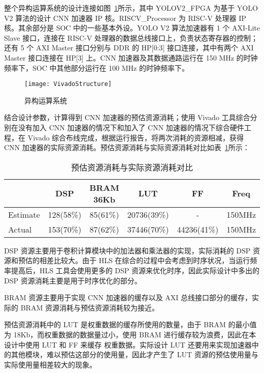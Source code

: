 整个异构运算系统的设计连接如图~\ref{fig:VivadoStructure}所示，其中 YOLOV2\_FPGA 为基于 YOLO V2 算法的设计 CNN 加速器 IP 核。RISCV\_Processor 为 RISC-V 处理器 IP 核。其余部分是 SOC 中的一些基本外设。YOLO V2 算法加速器有 1 个 AXI-Lite Slave 接口，连接在 RISC-V 处理器的数据总线接口上，负责状态寄存器的控制；还有 5 个 AXI Master 接口分别与 DDR 的 HP[0:3] 接口连接，其中有两个 AXI Master 接口连接在 HP[3] 上。CNN 加速器及其数据通路运行在 150 MHz 的时钟频率下，SOC 中其他部分运行在 100 MHz 的时钟频率下。

\begin{figure}[!htbp]
    \centering
    \texttt{[image: VivadoStructure]}
    \caption{异构运算系统}
    \label{fig:VivadoStructure}
\end{figure}

结合设计参数，计算得到 CNN 加速器的预估资源消耗；使用 Vivado 工具综合分别在没有加入 CNN 加速器的情况下和加入了 CNN 加速器的情况下综合硬件工程，在 Vivado 综合布线完成，根据运行报告，将两次消耗的资源相减，获得 CNN 加速器的实际资源消耗。预估资源消耗与实际资源消耗对比如表~\ref{tab:resource}所示：

\begin{table}[!htbp]
\caption{预估资源消耗与实际资源消耗对比}
\label{tab:resource}
\centering
\footnotesize%
\setlength{\tabcolsep}{4pt}%
\renewcommand{\arraystretch}{1.2}%
\begin{tabular}{lccccc}
\toprule
            & DSP       & BRAM 36Kb& LUT         & FF           & Freq \\
\midrule
Estimate    & 128(58\%) & 85(61\%) & 20736(39\%) & -            & 150MHz \\
Actual      & 153(70\%) & 87(62\%) & 37446(70\%) & 44236(41\%)  & 150MHz \\
\bottomrule
\end{tabular}
\end{table}

DSP 资源主要用于卷积计算模块中的加法器和乘法器的实现，实际消耗的 DSP 资源和预估的相差比较大。由于 HLS 在综合的过程中会考虑到时序状况，当运行频率提高后，HLS 工具会使用更多的 DSP 资源来优化时序，因此实际设计中多出的 DSP 资源消耗主要是用于时序优化的部分。

BRAM 资源主要用于实现 CNN 加速器的缓存以及 AXI 总线接口部分的缓存，实际的 BRAM 资源消耗与预估资源消耗较为接近。

预估资源消耗中的 LUT 是权重数据的缓存所使用的数量，由于 BRAM 的最小值为 18Kb，而权重数据的数据量过小，使用 BRAM 进行缓存较为浪费，因此在本设计中使用 LUT 和 FF 来缓存 权重数据。实际设计 LUT 还要用来实现加速器中的其他模块，难以预估这部分的使用量，因此才产生了 LUT 资源的预估使用量与实际使用量相差较大的现象。

